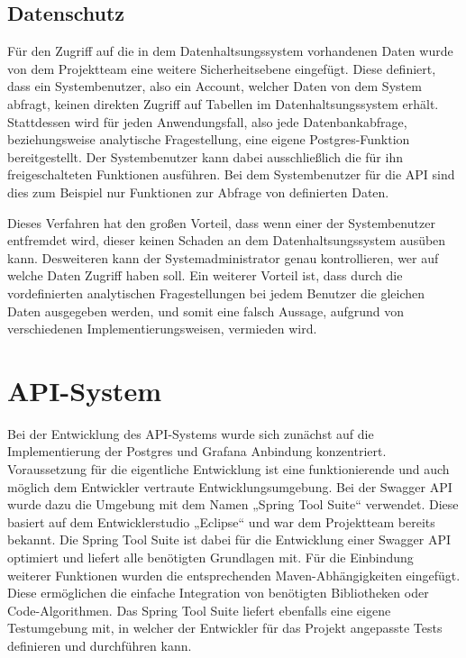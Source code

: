 \subsection{Datenschutz}
\label{subsec:postgres_datenschutz}
Für den Zugriff auf die in dem Datenhaltsungssystem vorhandenen Daten wurde von
dem Projektteam eine weitere Sicherheitsebene eingefügt. Diese definiert, dass
ein Systembenutzer, also ein Account, welcher Daten von dem System abfragt,
keinen direkten Zugriff auf Tabellen im Datenhaltsungssystem erhält.
Stattdessen wird für jeden Anwendungsfall, also jede Datenbankabfrage,
beziehungsweise analytische Fragestellung, eine eigene Postgres-Funktion
bereitgestellt. Der Systembenutzer kann dabei ausschließlich die für ihn
freigeschalteten Funktionen ausführen. Bei dem Systembenutzer für die API sind
dies zum Beispiel nur Funktionen zur Abfrage von definierten Daten.

Dieses Verfahren hat den großen Vorteil, dass wenn einer der Systembenutzer
entfremdet wird, dieser keinen Schaden an dem Datenhaltsungssystem ausüben
kann. Desweiteren kann der Systemadministrator genau kontrollieren, wer auf
welche Daten Zugriff haben soll. Ein weiterer Vorteil ist, dass durch die
vordefinierten analytischen Fragestellungen bei jedem Benutzer die gleichen
Daten ausgegeben werden, und somit eine falsch Aussage, aufgrund von
verschiedenen Implementierungsweisen, vermieden wird.
\nl%

\section{API-System}
\label{sec:api_system}
Bei der Entwicklung des API-Systems wurde sich zunächst auf die Implementierung
der Postgres und Grafana Anbindung konzentriert. Voraussetzung für die
eigentliche Entwicklung ist eine funktionierende und auch möglich dem
Entwickler vertraute Entwicklungsumgebung. Bei der Swagger API wurde dazu
die Umgebung mit dem Namen „Spring Tool Suite“ verwendet. Diese basiert auf
dem Entwicklerstudio „Eclipse“ und war dem Projektteam bereits bekannt. Die
Spring Tool Suite ist dabei für die Entwicklung einer Swagger API optimiert
und liefert alle benötigten Grundlagen mit. Für die Einbindung weiterer
Funktionen wurden die entsprechenden Maven-Abhängigkeiten eingefügt. Diese
ermöglichen die einfache Integration von benötigten Bibliotheken oder
Code-Algorithmen. Das Spring Tool Suite liefert ebenfalls eine eigene
Testumgebung mit, in welcher der Entwickler für das Projekt angepasste Tests
definieren und durchführen kann.


